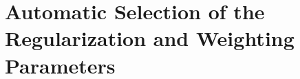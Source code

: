 \documentclass{aes60i}
\begin{document}

\section{Automatic Selection of the Regularization and Weighting Parameters}
\label{sec: auto}
\end{document}
